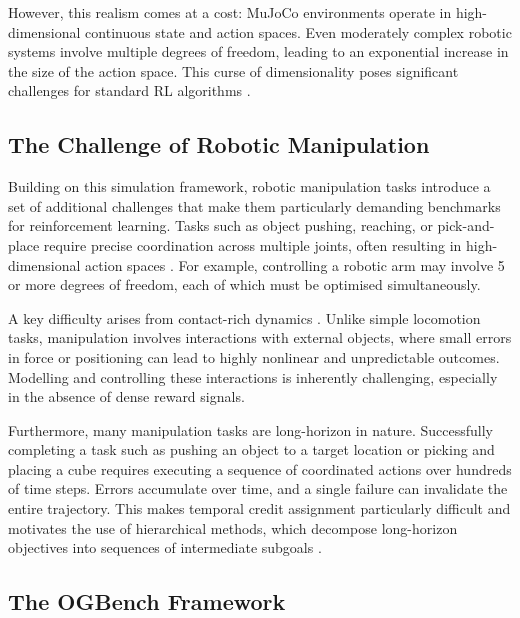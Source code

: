 However, this realism comes at a cost: MuJoCo environments operate in high-dimensional continuous state and action spaces. Even moderately complex robotic systems involve multiple degrees of freedom, leading to an exponential increase in the size of the action space. This curse of dimensionality poses significant challenges for standard RL algorithms \cite{bellman1957dynamic, sutton2018reinforcement}.

\subsection{The Challenge of Robotic Manipulation}

Building on this simulation framework, robotic manipulation tasks introduce a set of additional challenges that make them particularly demanding benchmarks for reinforcement learning. Tasks such as object pushing, reaching, or pick-and-place require precise coordination across multiple joints, often resulting in high-dimensional action spaces \cite{kober2013reinforcement}. For example, controlling a robotic arm may involve 5 or more degrees of freedom, each of which must be optimised simultaneously.

A key difficulty arises from contact-rich dynamics \cite{Lynch_Park_2017}. Unlike simple locomotion tasks, manipulation involves interactions with external objects, where small errors in force or positioning can lead to highly nonlinear and unpredictable outcomes. Modelling and controlling these interactions is inherently challenging, especially in the absence of dense reward signals.

Furthermore, many manipulation tasks are long-horizon in nature. Successfully completing a task such as pushing an object to a target location or picking and placing a cube requires executing a sequence of coordinated actions over hundreds of time steps. Errors accumulate over time, and a single failure can invalidate the entire trajectory. This makes temporal credit assignment particularly difficult and motivates the use of hierarchical methods, which decompose long-horizon objectives into sequences of intermediate subgoals \cite{SUTTON1999181,sutton2018reinforcement,nachum2018dataefficienthierarchicalreinforcementlearning}.

\subsection{The OGBench Framework}
\label{sec:experimental-environment}

